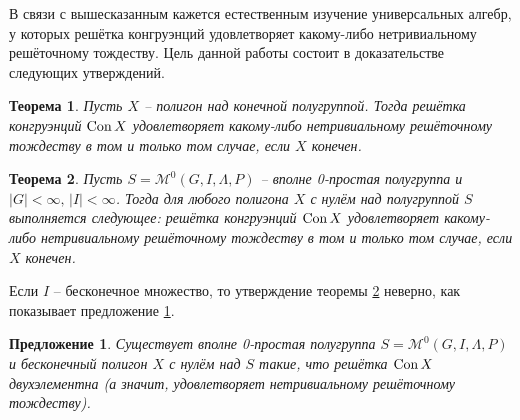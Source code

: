 \documentclass[a4paper]{article}
\newtheorem{theorem}{Теорема}
\newtheorem{proposition}{Предложение}
\newcommand{\Con}{\textnormal{Con}\, }
\begin{document}
	\par В связи с вышесказанным кажется естественным изучение универсальных алгебр, у которых решётка конгруэнций удовлетворяет какому-либо нетривиальному решёточному тождеству. Цель данной работы состоит в доказательстве следующих утверждений.
	
	\begin{theorem} \label{t01}
		Пусть $X$ -- полигон над конечной полугруппой. Тогда решётка конгруэнций $\Con X$ удовлетворяет какому-либо нетривиальному решёточному тождеству в том и только том случае, если $X$ конечен.
	\end{theorem}
	
	\begin{theorem} \label{t02}
		Пусть $S = \mathcal{M}^0(G,I,\Lambda,P)$ -- вполне 0-простая полугруппа и $|G| < \infty,\, |I| < \infty $. Тогда для любого полигона $X$ с нулём над полугруппой $S$ выполняется следующее: решётка конгруэнций $\Con X$ удовлетворяет какому-либо нетривиальному решёточному тождеству в том и только том случае, если $X$ конечен.
	\end{theorem}
	
	Если $I$ -- бесконечное множество, то утверждение теоремы \ref{t02} неверно, как показывает предложение \ref{pr01a}.
	
	\begin{proposition} \label{pr01a}
		Существует вполне 0-простая полугруппа $ S = \mathcal{M}^0(G,I,\Lambda,P) $ и бесконечный полигон $X$ с нулём над $S$ такие, что решётка $\Con X$ двухэлементна (а значит, удовлетворяет нетривиальному решёточному тождеству).
	\end{proposition}
	
\end{document}
